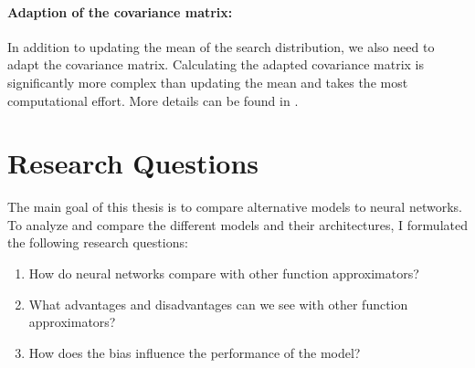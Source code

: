 \paragraph{Adaption of the covariance matrix:} In addition to updating the mean of the search distribution, we also need to adapt the covariance matrix. Calculating the adapted covariance matrix is significantly more complex than updating the mean and takes the most computational effort. More details can be found in \cite{hansen2016cma}.


\section{Research Questions}
\label{sec:research_questions}
The main goal of this thesis is to compare alternative models to neural networks. To analyze and compare the different models and their architectures, I formulated the following research questions:
\begin{enumerate}
  \item How do neural networks compare with other function approximators?
  \item What advantages and disadvantages can we see with other function approximators?
  \item How does the bias influence the performance of the model?
\end{enumerate}
